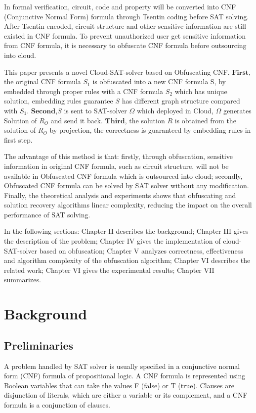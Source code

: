 \documentclass[runningheads,a4paper]{llncs}
\begin{document}
In formal verification, circuit, code and property will be converted into CNF (Conjunctive Normal Form) formula through Tsentin\cite{t4} coding before SAT solving. After Tsentin encoded, circuit structure and other sensitive information are still existed in CNF formula. 
To prevent unauthorized user get sensitive information from CNF formula, it is necessary to obfuscate CNF formula before outsourcing into cloud.

This paper presents a novel Cloud-SAT-solver based on Obfuscating CNF. 
$\mathbf{First}$, the original CNF formula $S_1$  is obfuscated into a new CNF formula S, by embedded through proper rules with a CNF formula $S_2$ which has unique solution, 
embedding rules guarantee $S$ has different graph structure compared with $S_1$.
$\mathbf{Second}$,$S$ is sent to SAT-solver $\Omega$ which deployed in Cloud, $\Omega$ generates Solution of $R_O$ and send it back. 
$\mathbf{Third}$, the solution $R$ is obtained from the solution of $R_O$ by projection, the correctness is guaranteed by embedding rules in first step.

The advantage of this method is that: firstly, through obfuscation, sensitive information in original CNF formula, such as circuit structure, will not be available in Obfuscated CNF formula which is outsourced into cloud; secondly, Obfuscated CNF formula can be solved by SAT solver without any modification. Finally, the theoretical analysis and experiments shows that obfuscating and solution recovery algorithms linear complexity, reducing the impact on the overall performance of SAT solving.

In the following sections: Chapter II describes the background; Chapter III gives the description of the problem; Chapter IV gives the implementation of cloud-SAT-solver based on obfuscation; Chapter V analyzes correctness, effectiveness and algorithm complexity of the obfuscation algorithm; Chapter VI describes the related work; Chapter VI gives the experimental results; Chapter VII summarizes.

\section{Background}
\subsection{Preliminaries}

A problem handled by SAT solver is usually specified in a conjunctive normal form (CNF) formula of propositional logic.
A CNF formula is represented using Boolean variables that can take the values F (false) or T (true). 
Clauses are disjunction of literals, which are either a variable or its complement, and a CNF formula is a conjunction of clauses.
\end{document}
